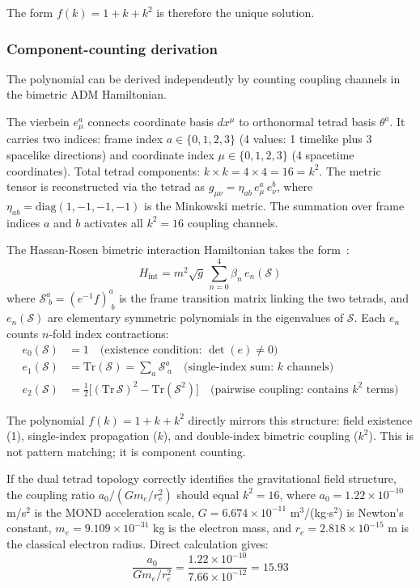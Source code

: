 \documentclass[aps,prd,preprint,superscriptaddress,showpacs,preprintnumbers,amsmath,amssymb,nofootinbib]{revtex4-2}
\begin{document}
The form $f(k) = 1 + k + k^2$ is therefore the unique solution.

\subsubsection*{Component-counting derivation}

The polynomial can be derived independently by counting coupling channels in the bimetric ADM Hamiltonian.

The vierbein $e^a_{\mu}$ connects coordinate basis $dx^{\mu}$ to orthonormal tetrad basis $\theta^a$. It carries two indices: frame index $a \in \{0,1,2,3\}$ (4 values: 1 timelike plus 3 spacelike directions) and coordinate index $\mu \in \{0,1,2,3\}$ (4 spacetime coordinates). Total tetrad components: $k \times k = 4 \times 4 = 16 = k^2$. The metric tensor is reconstructed via the tetrad as $g_{\mu\nu} = \eta_{ab}\, e^a_{\mu}\, e^b_{\nu}$, where $\eta_{ab} = \mathrm{diag}(1,-1,-1,-1)$ is the Minkowski metric. The summation over frame indices $a$ and $b$ activates all $k^2 = 16$ coupling channels.

The Hassan-Rosen bimetric interaction Hamiltonian takes the form~\cite{hassan2012}:
\begin{equation}
H_{\mathrm{int}} = m^2 \sqrt{g}\, \sum_{n=0}^{4} \beta_n\, e_n(\mathcal{S})
\end{equation}
where $\mathcal{S}^a_{\;b} = (e^{-1}f)^a_{\;b}$ is the frame transition matrix linking the two tetrads, and $e_n(\mathcal{S})$ are elementary symmetric polynomials in the eigenvalues of $\mathcal{S}$. Each $e_n$ counts $n$-fold index contractions:
\begin{align}
e_0(\mathcal{S}) &= 1 \quad \text{(existence condition: $\det(e) \neq 0$)} \\
e_1(\mathcal{S}) &= \mathrm{Tr}(\mathcal{S}) = \sum_a \mathcal{S}^a_{\;a} \quad \text{(single-index sum: $k$ channels)} \\
e_2(\mathcal{S}) &= \tfrac{1}{2}\bigl[(\mathrm{Tr}\,\mathcal{S})^2 - \mathrm{Tr}(\mathcal{S}^2)\bigr] \quad \text{(pairwise coupling: contains $k^2$ terms)}
\end{align}

The polynomial $f(k) = 1 + k + k^2$ directly mirrors this structure: field existence (1), single-index propagation ($k$), and double-index bimetric coupling ($k^2$). This is not pattern matching; it is component counting.

If the dual tetrad topology correctly identifies the gravitational field structure, the coupling ratio $a_0 / (G m_e / r_e^2)$ should equal $k^2 = 16$, where $a_0 = 1.22 \times 10^{-10}$ m/s$^2$ is the MOND acceleration scale, $G = 6.674 \times 10^{-11}$ m$^3$/(kg$\cdot$s$^2$) is Newton's constant, $m_e = 9.109 \times 10^{-31}$ kg is the electron mass, and $r_e = 2.818 \times 10^{-15}$ m is the classical electron radius. Direct calculation gives:
\begin{equation}
\frac{a_0}{G m_e / r_e^2} = \frac{1.22 \times 10^{-10}}{7.66 \times 10^{-12}} = 15.93
\end{equation}
\end{document}

